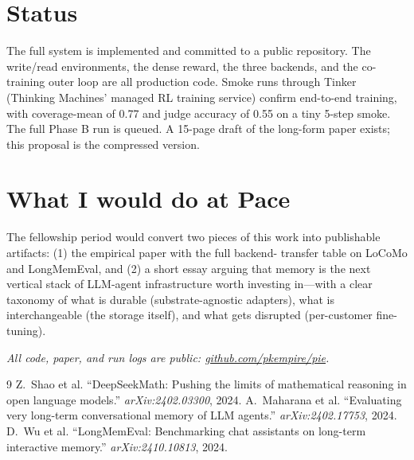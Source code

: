 \documentclass[11pt]{article}
\begin{document}
\section*{Status}

The full system is implemented and committed to a public repository. The
write/read environments, the dense reward, the three backends, and the
co-training outer loop are all production code. Smoke runs through
Tinker (Thinking Machines' managed RL training service) confirm
end-to-end training, with coverage-mean of 0.77 and judge accuracy of
0.55 on a tiny 5-step smoke. The full Phase B run is queued. A 15-page
draft of the long-form paper exists; this proposal is the compressed
version.

\section*{What I would do at Pace}

The fellowship period would convert two pieces of this work into
publishable artifacts: (1) the empirical paper with the full backend-
transfer table on LoCoMo and LongMemEval, and (2) a short essay arguing
that memory is the next vertical stack of LLM-agent infrastructure
worth investing in---with a clear taxonomy of what is durable
(substrate-agnostic adapters), what is interchangeable (the storage
itself), and what gets disrupted (per-customer fine-tuning).

\bigskip
\noindent\textit{All code, paper, and run logs are public:
\href{https://github.com/pkempire/pie}{github.com/pkempire/pie}.}


\begin{thebibliography}{9}
 Z.\ Shao et al. ``DeepSeekMath: Pushing
the limits of mathematical reasoning in open language models.''
\emph{arXiv:2402.03300}, 2024.
 A.\ Maharana et al. ``Evaluating very
long-term conversational memory of LLM agents.''
\emph{arXiv:2402.17753}, 2024.
 D.\ Wu et al. ``LongMemEval: Benchmarking
chat assistants on long-term interactive memory.''
\emph{arXiv:2410.10813}, 2024.
\end{thebibliography}
\end{document}
